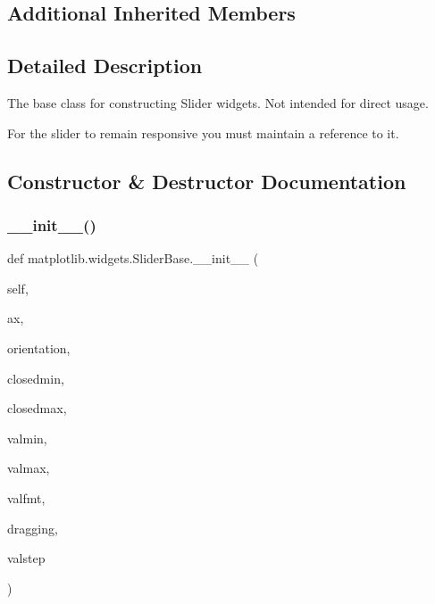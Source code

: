 \subsection*{Additional Inherited Members}


\subsection{Detailed Description}
\begin{DoxyVerb}The base class for constructing Slider widgets. Not intended for direct
usage.

For the slider to remain responsive you must maintain a reference to it.
\end{DoxyVerb}
 

\subsection{Constructor \& Destructor Documentation}
\mbox{\label{classmatplotlib_1_1widgets_1_1SliderBase_a01c50f7d46e6e75af375c1a9241daeb4}} 
\subsubsection{\texorpdfstring{\+\_\+\+\_\+init\+\_\+\+\_\+()}{\_\_init\_\_()}}
{\footnotesize\ttfamily def matplotlib.\+widgets.\+Slider\+Base.\+\_\+\+\_\+init\+\_\+\+\_\+ (\begin{DoxyParamCaption}\item[{}]{self,  }\item[{}]{ax,  }\item[{}]{orientation,  }\item[{}]{closedmin,  }\item[{}]{closedmax,  }\item[{}]{valmin,  }\item[{}]{valmax,  }\item[{}]{valfmt,  }\item[{}]{dragging,  }\item[{}]{valstep }\end{DoxyParamCaption})}



